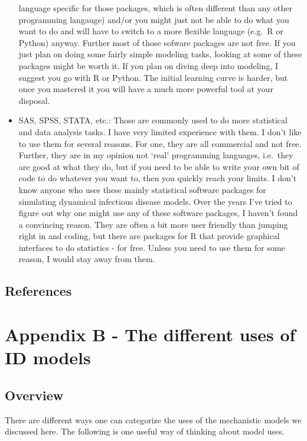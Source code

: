 \documentclass[]{book}
\theoremstyle{definition}
\theoremstyle{definition}
\theoremstyle{definition}
\theoremstyle{remark}
\begin{document}
\begin{itemize}
  language specific for those packages, which is often different than
  any other programming langauge) and/or you might just not be able to
  do what you want to do and will have to switch to a more flexible
  language (e.g.~R or Python) anyway. Further most of those sofware
  packages are not free. If you just plan on doing some fairly simple
  modeling tasks, looking at some of these packages might be worth it.
  If you plan on diving deep into modeling, I suggest you go with R or
  Python. The initial learning curve is harder, but once you mastered it
  you will have a much more powerful tool at your disposal.
\item
  SAS, SPSS, STATA, etc.: Those are commonly used to do more statistical
  and data analysis tasks. I have very limited experience with them. I
  don't like to use them for several reasons. For one, they are all
  commercial and not free. Further, they are in my opinion not `real'
  programming languages, i.e.~they are good at what they do, but if you
  need to be able to write your own bit of code to do whatever you want
  to, then you quickly reach your limits. I don't know anyone who uses
  these mainly statistical software packages for simulating dynamical
  infectious disease models. Over the years I've tried to figure out why
  one might use any of these software packages, I haven't found a
  convincing reason. They are often a bit more user friendly than
  jumping right in and coding, but there are packages for R that provide
  graphical interfaces to do statistics - for free. Unless you need to
  use them for some reason, I would stay away from them.
\end{itemize}

\section{References}\label{references-17}

\chapter{Appendix B - The different uses of ID
models}\label{appendix-b---the-different-uses-of-id-models}

\section{Overview}\label{overview-1}

There are different ways one can categorize the uses of the mechanistic
models we discussed here. The following is one useful way of thinking
about model uses.
\end{document}
